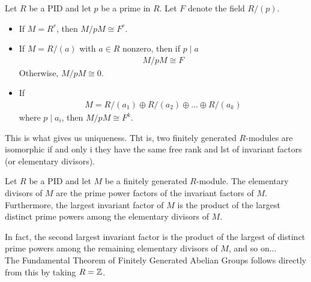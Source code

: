 \documentclass{memoir}
\begin{document}
\begin{lemma}
	Let \(R\) be a PID and let \(p\) be a prime in \(R\). Let \(F\) denote the field \(R / (p)\).
	\begin{itemize}
		\item If \(M = R^{r}\), then \(M / pM \cong F^{r}\).
		\item If \(M = R / (a)\) with \(a\in R\) nonzero, then if \(p\mid a\) 
			\begin{align*}
				M / pM \cong F
			\end{align*}
			Otherwise, \(M / pM \cong 0\).
		\item If
			\begin{align*}
				M = R / (a_1) \oplus R / (a_2) \oplus \ldots \oplus R / (a_k)
			\end{align*}
			where \(p\mid a_i\), then \(M / pM \cong F^{k}\).
	\end{itemize}
\end{lemma}
This is what gives us uniqueness. Tht is, two finitely generated \(R\)-modules are isomorphic if and only i they have the same free rank and lst of invariant factors (or elementary divisors).

\begin{cor}
	Let \(R\) be a PID and let \(M\) be a finitely generated \(R\)-module. The elementary divisors of \(M\) are the prime power factors of the invariant factors of \(M\). Furthermore, the largest invariant factor of \(M\) is the product of the largest distinct prime powers among the elementary divisors of \(M\).
\end{cor}
In fact, the second largest invariant factor is the product of the largest of distinct prime powers among the remaining elementary divisors of \(M\), and so on...\\

The Fundamental Theorem of Finitely Generated Abelian Groups follows directly from this by taking \(R = \mathbb{Z}\).

\end{document}
